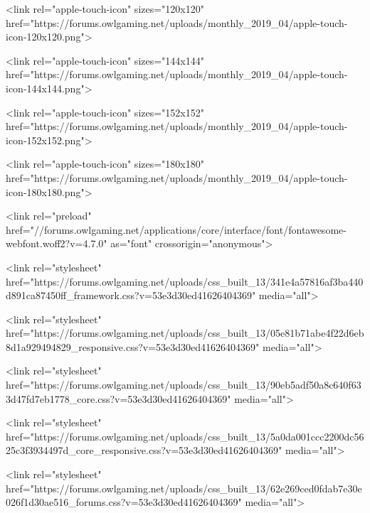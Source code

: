 		
	

	
		
			
				<link rel="apple-touch-icon" sizes="120x120" href="https://forums.owlgaming.net/uploads/monthly_2019_04/apple-touch-icon-120x120.png">
			
		
	

	
		
			
				<link rel="apple-touch-icon" sizes="144x144" href="https://forums.owlgaming.net/uploads/monthly_2019_04/apple-touch-icon-144x144.png">
			
		
	

	
		
			
				<link rel="apple-touch-icon" sizes="152x152" href="https://forums.owlgaming.net/uploads/monthly_2019_04/apple-touch-icon-152x152.png">
			
		
	

	
		
			
				<link rel="apple-touch-icon" sizes="180x180" href="https://forums.owlgaming.net/uploads/monthly_2019_04/apple-touch-icon-180x180.png">
			
		
	





<link rel="preload" href="//forums.owlgaming.net/applications/core/interface/font/fontawesome-webfont.woff2?v=4.7.0" as="font" crossorigin="anonymous">
		




	<link rel="stylesheet" href="https://forums.owlgaming.net/uploads/css_built_13/341e4a57816af3ba440d891ca87450ff_framework.css?v=53e3d30ed41626404369" media="all">

	<link rel="stylesheet" href="https://forums.owlgaming.net/uploads/css_built_13/05e81b71abe4f22d6eb8d1a929494829_responsive.css?v=53e3d30ed41626404369" media="all">

	<link rel="stylesheet" href="https://forums.owlgaming.net/uploads/css_built_13/90eb5adf50a8c640f633d47fd7eb1778_core.css?v=53e3d30ed41626404369" media="all">

	<link rel="stylesheet" href="https://forums.owlgaming.net/uploads/css_built_13/5a0da001ccc2200dc5625c3f3934497d_core_responsive.css?v=53e3d30ed41626404369" media="all">

	<link rel="stylesheet" href="https://forums.owlgaming.net/uploads/css_built_13/62e269ced0fdab7e30e026f1d30ae516_forums.css?v=53e3d30ed41626404369" media="all">

